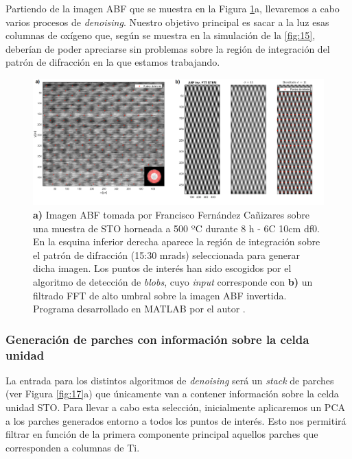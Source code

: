 Partiendo de la imagen ABF que se muestra en la Figura \ref{fig:16}a, llevaremos a cabo varios procesos de \textit{denoising}. Nuestro objetivo principal es sacar a la luz esas columnas de oxígeno que, según se muestra en la simulación de la \autoref{fig:15}, deberían de poder apreciarse sin problemas sobre la región de integración del patrón de difracción en la que estamos trabajando.

\begin{figure}[h!]
    \centering
    \includegraphics[width=1\textwidth]{fig/Fig16.png}
    \caption{\textbf{a)} Imagen ABF tomada por Francisco Fernández Cañizares sobre una muestra de STO horneada a 500 ºC durante 8 h - 6C 10cm df0. En la esquina inferior derecha aparece la región de integración sobre el patrón de difracción (15:30 mrads) seleccionada para generar dicha imagen. Los puntos de interés han sido escogidos por el algoritmo de detección de \textit{blobs}, cuyo \textit{input} corresponde con \textbf{b)} un filtrado FFT de alto umbral sobre la imagen ABF invertida. Programa desarrollado en MATLAB por el autor \cite{repo}.}
    \label{fig:16}
\end{figure}

\subsubsection{Generación de parches con información sobre la celda unidad}

La entrada para los distintos algoritmos de \textit{denoising} será un \textit{stack} de parches (ver Figura \ref{fig:17}a) que únicamente van a contener información sobre la celda unidad STO. Para llevar a cabo esta selección, inicialmente aplicaremos un PCA a los parches generados entorno a todos los puntos de interés. Esto nos permitirá filtrar en función de la primera componente principal aquellos parches que corresponden a columnas de Ti.\\

